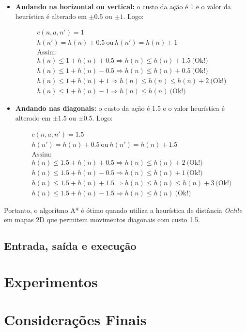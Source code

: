 \documentclass[12pt]{article}
\begin{document}
\begin{itemize}
	\item \textbf{Andando na horizontal ou vertical:} o custo da ação é 1 e o valor da heurística é alterado em $ \pm 0.5 $ ou $ \pm 1 $. Logo:

	\begin{align*}
		c(n, a, n') = 1 \\
		h(n') = h(n) \pm 0.5 ~ \text{ou} ~ h(n') = h(n) \pm 1 \\
		\text{Assim:} \\
		h(n) \leq 1 + h(n) + 0.5 \Rightarrow h(n) \leq h(n) + 1.5 ~ \text{(Ok!)} \\
		h(n) \leq 1 + h(n) - 0.5 \Rightarrow h(n) \leq h(n) + 0.5 ~ \text{(Ok!)} \\
		h(n) \leq 1 + h(n) + 1 \Rightarrow h(n) \leq h(n) \leq h(n) + 2 ~ \text{(Ok!)} \\
		h(n) \leq 1 + h(n) - 1 \Rightarrow h(n) \leq h(n) ~ \text{(Ok!)}
	\end{align*}

	\item \textbf{Andando nas diagonais:} o custo da ação é 1.5 e o valor heurística é alterado em $ \pm 1.5 $ ou $ \pm 0.5 $. Logo:

	\begin{align*}
		c(n, a, n') = 1.5 \\
		h(n') = h(n) \pm 0.5 ~ \text{ou} ~ h(n') = h(n) \pm 1.5 \\
		\text{Assim:} \\
		h(n) \leq 1.5 + h(n) + 0.5 \Rightarrow h(n) \leq h(n) + 2 ~ \text{(Ok!)} \\
		h(n) \leq 1.5 + h(n) - 0.5 \Rightarrow h(n) \leq h(n) + 1 ~ \text{(Ok!)} \\
		h(n) \leq 1.5 + h(n) + 1.5 \Rightarrow h(n) \leq h(n) \leq h(n) + 3 ~ \text{(Ok!)} \\
		h(n) \leq 1.5 + h(n) - 1.5 \Rightarrow h(n) \leq h(n) ~ \text{(Ok!)}
	\end{align*}
\end{itemize}

Portanto, o algoritmo A* é ótimo quando utiliza a heurística de distância \textit{Octile} em mapas 2D que permitem movimentos diagonais com custo 1.5.

\subsection{Entrada, saída e execução}



\section{Experimentos}


\section{Considerações Finais}



\end{document}
